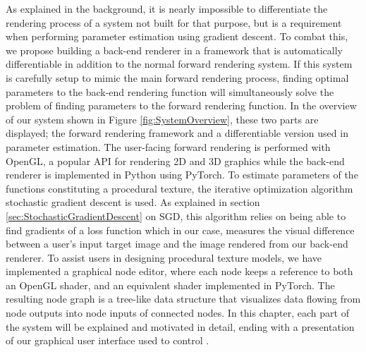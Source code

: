 As explained in the background, it is nearly impossible to differentiate the rendering process of a system not built for that purpose, but is a requirement when performing parameter estimation using gradient descent. To combat this, we propose building a back-end renderer in a framework that is automatically differentiable in addition to the normal forward rendering system. If this system is carefully setup to mimic the main forward rendering process, finding optimal parameters to the back-end rendering function will simultaneously solve the problem of finding parameters to the forward rendering function. In the overview of our system shown in Figure \ref{fig:SystemOverview}, these two parts are displayed; the forward rendering framework and a differentiable version used in parameter estimation. The user-facing forward rendering is performed with OpenGL, a popular API for rendering 2D and 3D graphics while the back-end renderer is implemented in Python using PyTorch. To estimate parameters of the functions constituting a procedural texture, the iterative optimization algorithm stochastic gradient descent is used. As explained in section \ref{sec:StochasticGradientDescent} on SGD, this algorithm relies on being able to find gradients of a loss function which in our case, measures the visual difference between a user's input target image and the image rendered from our back-end renderer. To assist users in designing procedural texture models, we have implemented a graphical node editor, where each node keeps a reference to both an OpenGL shader, and an equivalent shader implemented in PyTorch. The resulting node graph is a tree-like data structure that visualizes data flowing from node outputs into node inputs of connected nodes. In this chapter, each part of the system will be explained and motivated in detail, ending with a presentation of our graphical user interface used to control \dipter{}.

